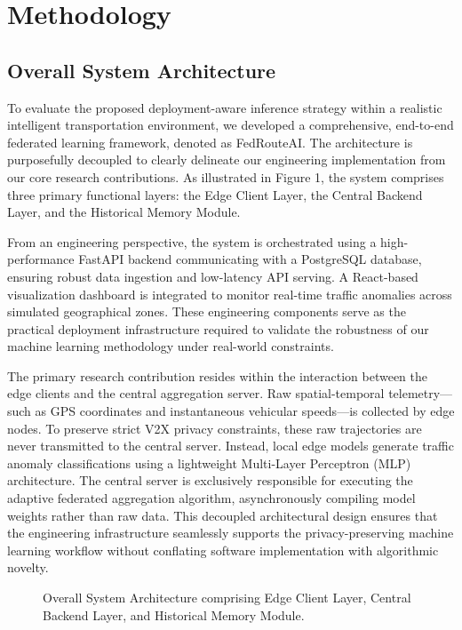 \section{Methodology}

\subsection{Overall System Architecture}

To evaluate the proposed deployment-aware inference strategy within a realistic intelligent transportation environment, we developed a comprehensive, end-to-end federated learning framework, denoted as FedRouteAI. The architecture is purposefully decoupled to clearly delineate our engineering implementation from our core research contributions. As illustrated in Figure 1, the system comprises three primary functional layers: the Edge Client Layer, the Central Backend Layer, and the Historical Memory Module.

From an engineering perspective, the system is orchestrated using a high-performance FastAPI backend communicating with a PostgreSQL database, ensuring robust data ingestion and low-latency API serving. A React-based visualization dashboard is integrated to monitor real-time traffic anomalies across simulated geographical zones. These engineering components serve as the practical deployment infrastructure required to validate the robustness of our machine learning methodology under real-world constraints.

The primary research contribution resides within the interaction between the edge clients and the central aggregation server. Raw spatial-temporal telemetry---such as GPS coordinates and instantaneous vehicular speeds---is collected by edge nodes. To preserve strict V2X privacy constraints, these raw trajectories are never transmitted to the central server. Instead, local edge models generate traffic anomaly classifications using a lightweight Multi-Layer Perceptron (MLP) architecture. The central server is exclusively responsible for executing the adaptive federated aggregation algorithm, asynchronously compiling model weights rather than raw data. This decoupled architectural design ensures that the engineering infrastructure seamlessly supports the privacy-preserving machine learning workflow without conflating software implementation with algorithmic novelty.

\begin{figure}[htbp]
\centering
\caption{Overall System Architecture comprising Edge Client Layer, Central Backend Layer, and Historical Memory Module.}
\label{fig:architecture}
\end{figure}

